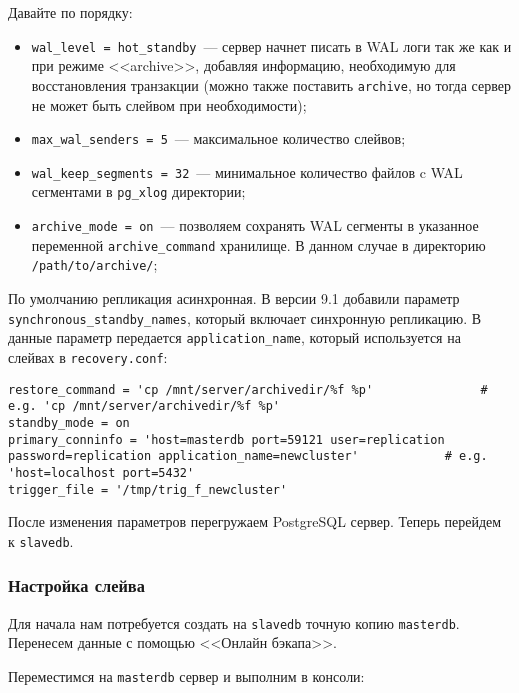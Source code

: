 Давайте по порядку:

\begin{itemize}
  \item \lstinline!wal_level = hot_standby!~--- сервер начнет писать в WAL логи так же как и при режиме <<archive>>, добавляя информацию, необходимую для восстановления транзакции (можно также поставить \lstinline!archive!, но тогда сервер не может быть слейвом при необходимости);
  \item \lstinline!max_wal_senders = 5!~--- максимальное количество слейвов;
  \item \lstinline!wal_keep_segments = 32!~--- минимальное количество файлов c WAL сегментами в \lstinline!pg_xlog! директории;
  \item \lstinline!archive_mode = on!~--- позволяем сохранять WAL сегменты в указанное переменной \lstinline!archive_command! хранилище. В данном случае в директорию \lstinline!/path/to/archive/!;
\end{itemize}

По умолчанию репликация асинхронная. В версии 9.1 добавили параметр \lstinline!synchronous_standby_names!, который включает синхронную репликацию. В данные параметр передается \lstinline!application_name!, который используется на слейвах в \lstinline!recovery.conf!:

\begin{lstlisting}[label=lst:streaming91,caption=recovery.conf для синхронной репликации на слейве]
restore_command = 'cp /mnt/server/archivedir/%f %p'               # e.g. 'cp /mnt/server/archivedir/%f %p'
standby_mode = on
primary_conninfo = 'host=masterdb port=59121 user=replication password=replication application_name=newcluster'            # e.g. 'host=localhost port=5432'
trigger_file = '/tmp/trig_f_newcluster'
\end{lstlisting}

После изменения параметров перегружаем PostgreSQL сервер. Теперь перейдем к \lstinline!slavedb!.

\subsubsection{Настройка слейва}
\label{subsec:streaming-slave-settings}

Для начала нам потребуется создать на \lstinline!slavedb! точную копию \lstinline!masterdb!. Перенесем данные с помощью <<Онлайн бэкапа>>.

Переместимся на \lstinline!masterdb! сервер и выполним в консоли:

